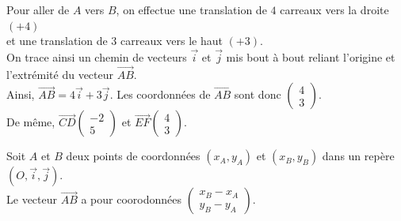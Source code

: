 \begin{Méthode}
\begin{center}
\begin{tikzpicture}[scale=0.6]
    
\end{tikzpicture}

\end{center}
Pour aller de $A$ vers $B$, on effectue une translation de $4$ carreaux vers la droite $(+4)$\\ et une translation de $3$ carreaux vers le haut  $(+3)$. \\
On trace ainsi un \og chemin \fg{} de vecteurs $\overrightarrow{i}$ et $\overrightarrow{j}$ mis bout à bout reliant l'origine et l'extrémité du vecteur $\overrightarrow{AB}$. \\
Ainsi, $\overrightarrow{AB}=4\overrightarrow{i}+3\overrightarrow{j}$. Les coordonnées de $\overrightarrow{AB}$ sont donc $\begin{pmatrix} 
4 \\ 
3
 \end{pmatrix}$. \\
 De même, $\overrightarrow{CD}\begin{pmatrix} 
-2 \\ 
5
 \end{pmatrix}$ et $\overrightarrow{EF}\begin{pmatrix} 
4 \\ 
3
 \end{pmatrix}$.
 

\end{Méthode}



\begin{Propriété}
Soit $A$ et $B$ deux points de coordonnées $(x_A,y_A)$ et $(x_B,y_B)$ dans un repère $(O,\overrightarrow{i},\overrightarrow{j})$.\\
Le vecteur $\overrightarrow{AB}$ a pour coorodonnées $\begin{pmatrix} 
x_B-x_A \\ 
y_B-y_A
 \end{pmatrix}$.
\end{Propriété}

